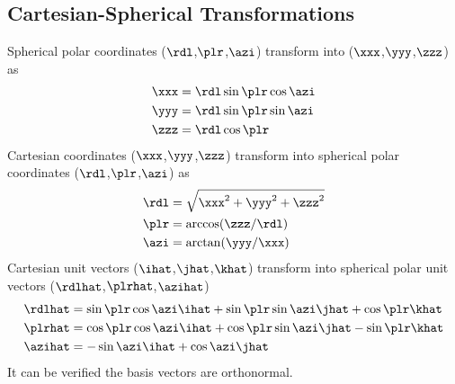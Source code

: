 \documentclass[12pt,twoside]{book}
\begin{document}
\subsection[Cartesian-Spherical Transormations]{Cartesian-Spherical Transformations}\label{sxn:crt_sph}
Spherical polar coordinates ($\rdl$,$\plr$,$\azi$) transform into
 ($\xxx$,$\yyy$,$\zzz$) as
\begin{subequations}
\begin{align}
\xxx & = \rdl\sin\plr\cos\azi \\
\yyy & = \rdl\sin\plr\sin\azi \\
\zzz & = \rdl\cos\plr
\label{eqn:sph_crt_trn}
\end{align}
\end{subequations}
Cartesian coordinates ($\xxx$,$\yyy$,$\zzz$) transform into
spherical polar coordinates ($\rdl$,$\plr$,$\azi$) as
\begin{subequations}
\begin{align}
\rdl & = \sqrt{\xxx^{2}+\yyy^{2}+\zzz^{2}} \\
\plr & = \arccos(\zzz/\rdl) \\
\azi & = \arctan(\yyy/\xxx)
\label{eqn:crt_sph_trn}
\end{align}
\end{subequations}
Cartesian unit vectors ($\ihat$,$\jhat$,$\khat$) transform into
spherical polar unit vectors ($\rdlhat$,$\plrhat$,$\azihat$)
\begin{subequations}
\begin{align}
\rdlhat & = \sin\plr\cos\azi\ihat + \sin\plr\sin\azi\jhat + \cos\plr\khat \\
\plrhat & = \cos\plr\cos\azi\ihat + \cos\plr\sin\azi\jhat - \sin\plr\khat \\
\azihat & = -\sin\azi\ihat + \cos\azi\jhat
\label{eqn:crt_sph_unit_vct_trn}
\end{align}
\end{subequations}
It can be verified the basis vectors are orthonormal.
\end{document}
